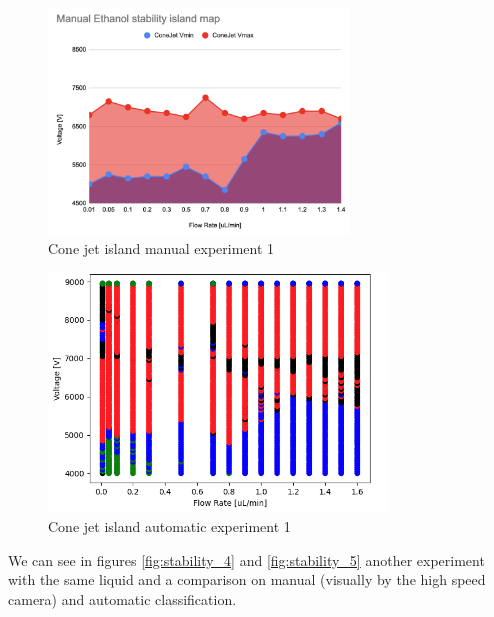     \begin{multicols}{2}


        \begin{figure}[H]
            \center
            \includegraphics[width=8cm]{Figuras/april/manual_stability.png}
            \caption{Cone jet island manual experiment 1}
            \label{fig:stability_2}
        \end{figure}

        \begin{figure}[H]
            \center
            \includegraphics[width=9cm]{Figuras/report3/map-exp-26-01.png}
            \caption{Cone jet island automatic experiment 1}
            \label{fig:stability_3}
        \end{figure}

    \end{multicols}

    We can see in figures \ref{fig:stability_4} and \ref{fig:stability_5} another experiment with the same liquid and a comparison on manual (visually by the high speed camera) and automatic classification.


